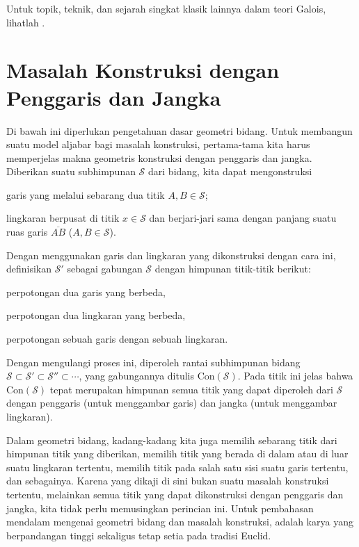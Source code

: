 Untuk topik, teknik, dan sejarah singkat klasik lainnya dalam teori Galois, lihatlah \cite{ZhP}.

\section{Masalah Konstruksi dengan Penggaris dan Jangka}
Di bawah ini diperlukan pengetahuan dasar geometri bidang. Untuk membangun suatu model aljabar bagi masalah konstruksi, pertama-tama kita harus memperjelas makna geometris konstruksi dengan penggaris dan jangka. Diberikan suatu subhimpunan $\mathcal{S}$ dari bidang, kita dapat mengonstruksi
\begin{compactitem}
	\item garis yang melalui sebarang dua titik $A, B \in \mathcal{S}$;
	\item lingkaran berpusat di titik $x \in \mathcal{S}$ dan berjari-jari sama dengan panjang suatu ruas garis $\overline{AB}$ ($A,B \in \mathcal{S}$).
\end{compactitem}
Dengan menggunakan garis dan lingkaran yang dikonstruksi dengan cara ini, definisikan $\mathcal{S}'$ sebagai gabungan $\mathcal{S}$ dengan himpunan titik-titik berikut:
\begin{compactitem}
	\item perpotongan dua garis yang berbeda,
	\item perpotongan dua lingkaran yang berbeda,
	\item perpotongan sebuah garis dengan sebuah lingkaran.
\end{compactitem}
Dengan mengulangi proses ini, diperoleh rantai subhimpunan bidang $\mathcal{S} \subset \mathcal{S}' \subset \mathcal{S}'' \subset \cdots$, yang gabungannya ditulis $\text{Con}(\mathcal{S})$. Pada titik ini jelas bahwa $\text{Con}(\mathcal{S})$ tepat merupakan himpunan semua titik yang dapat diperoleh dari $\mathcal{S}$ dengan penggaris (untuk menggambar garis) dan jangka (untuk menggambar lingkaran). 

Dalam geometri bidang, kadang-kadang kita juga memilih sebarang titik dari himpunan titik yang diberikan, memilih titik yang berada di dalam atau di luar suatu lingkaran tertentu, memilih titik pada salah satu sisi suatu garis tertentu, dan sebagainya. Karena yang dikaji di sini bukan suatu masalah konstruksi tertentu, melainkan semua titik yang dapat dikonstruksi dengan penggaris dan jangka, kita tidak perlu memusingkan perincian ini. Untuk pembahasan mendalam mengenai geometri bidang dan masalah konstruksi, \cite{Har00} adalah karya yang berpandangan tinggi sekaligus tetap setia pada tradisi Euclid.


